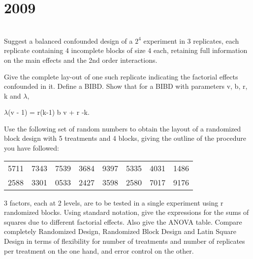 \section*{2009}
\vspace{-.5cm}
\hrulefill \smallskip\\
 Suggest a balanced confounded design of a $2^4$ experiment in 3 replicates, each replicate containing 4 incomplete blocks of size 4 each, retaining full information on the main effects and the 2nd order interactions.

Give the complete lay-out of one such replicate indicating the factorial effects confounded in it.
\myline
{} Define a BIBD. Show that for a BIBD with parameters v, b, r, k and $\lambda$,
\begin{tasks}[]
    \task $\lambda$(v - 1) = r(k-1)
    \task b \geq v + r -k.
\end{tasks}
 Use the following set of random numbers to obtain the layout of a randomized block design with 5 treatments and 4 blocks, giving the outline of the procedure you have followed:
\begin{center}
 \begin{tabular}{*{8}{c}}
    5711 & 7343 & 7539 & 3684 & 9397 & 5335 & 4031 & 1486  \\
    2588 & 3301 & 0533 & 2427 & 3598 & 2580 & 7017 & 9176 
\end{tabular}   
\end{center}
 3 factors, each at 2 levels, are to be tested in a single experiment using r randomized blocks. Using standard notation, give the expressions for the sums of squares due to different factorial effects. Also give the ANOVA table.
\myline
{} Compare completely Randomized Design, Randomized Block Design and Latin Square Design in terms of flexibility for number of treatments and number of replicates per treatment on the one hand, and error control on the other.